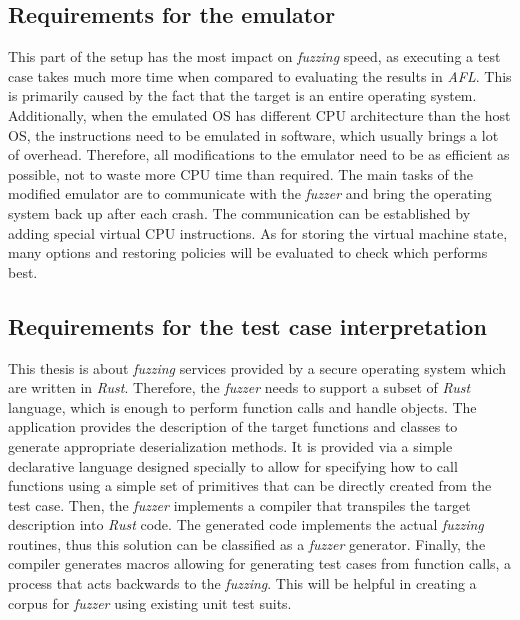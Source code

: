 \subsection{Requirements for the emulator}
This part of the setup has the most impact on \textit{fuzzing} speed, as executing a test case takes much more time when compared to evaluating the results in \textit{AFL}. This is primarily caused by the fact that the target is an entire operating system. Additionally, when the emulated OS has different CPU architecture than the host OS, the instructions need to be emulated in software, which usually brings a lot of overhead. Therefore, all modifications to the emulator need to be as efficient as possible, not to waste more CPU time than required. The main tasks of the modified emulator are to communicate with the \textit{fuzzer} and bring the operating system back up after each crash. The communication can be established by adding special virtual CPU instructions. As for storing the virtual machine state, many options and restoring policies will be evaluated to check which performs best.

\subsection{Requirements for the test case interpretation}
This thesis is about \textit{fuzzing} services provided by a secure operating system which are written in \textit{Rust}. Therefore, the \textit{fuzzer} needs to support a subset of \textit{Rust} language, which is enough to perform function calls and handle objects. The application provides the description of the target functions and classes to generate appropriate deserialization methods. It is provided via a simple declarative language designed specially to allow for specifying how to call functions using a simple set of primitives that can be directly created from the test case. Then, the \textit{fuzzer} implements a compiler that transpiles the target description into \textit{Rust} code. The generated code implements the actual \textit{fuzzing} routines, thus this solution can be classified as a \textit{fuzzer} generator. Finally, the compiler generates macros allowing for generating test cases from function calls, a process that acts backwards to the \textit{fuzzing}. This will be helpful in creating a corpus for \textit{fuzzer} using existing unit test suits. 

